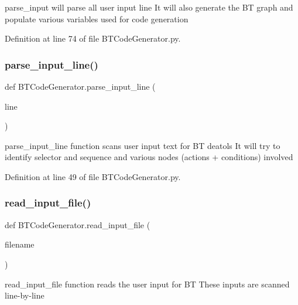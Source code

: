 \textquotesingle{}parse\+\_\+input\textquotesingle{} will parse all user input line It will also generate the BT graph and populate various variables used for code generation 



Definition at line 74 of file B\+T\+Code\+Generator.\+py.

\mbox{\label{namespace_b_t_code_generator_ae52de22cf4520aa14434a2df5bba24e7}} 
\subsubsection{\texorpdfstring{parse\_input\_line()}{parse\_input\_line()}}
{\footnotesize\ttfamily def B\+T\+Code\+Generator.\+parse\+\_\+input\+\_\+line (\begin{DoxyParamCaption}\item[{}]{line }\end{DoxyParamCaption})}



\textquotesingle{}parse\+\_\+input\+\_\+line\textquotesingle{} function scans user input text for BT deatols It will try to identify selector and sequence and various nodes (actions + conditions) involved 



Definition at line 49 of file B\+T\+Code\+Generator.\+py.

\mbox{\label{namespace_b_t_code_generator_a548841053dca7d0b9bb401d8a71259aa}} 
\subsubsection{\texorpdfstring{read\_input\_file()}{read\_input\_file()}}
{\footnotesize\ttfamily def B\+T\+Code\+Generator.\+read\+\_\+input\+\_\+file (\begin{DoxyParamCaption}\item[{}]{filename }\end{DoxyParamCaption})}



\textquotesingle{}read\+\_\+input\+\_\+file\textquotesingle{} function reads the user input for BT These inputs are scanned line-\/by-\/line 



